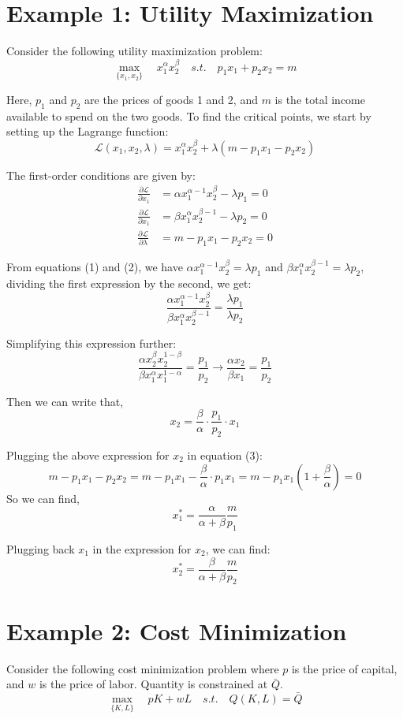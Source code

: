 \documentclass{./../../latex/handout}
\begin{document}
\thispagestyle{plain}
\newcommand{\mytitle}{Optimization Examples}
\myheader{\mytitle}

\section*{Example 1: Utility Maximization}
Consider the following utility maximization problem:\[ \max_{\{x_1,x_2\}} \quad x_1^{\alpha} x_2^{\beta} \quad s.t. \quad p_1 x_1 + p_2 x_2 = m \]
 
 Here, $p_1$ and $p_2$ are the prices of goods 1 and 2, and $m$ is the total income available to spend on the two goods. 
 To find the critical points, we start by setting up the Lagrange function: 
  \[ \mathcal{L}(x_1,x_2,\lambda) =  x_1^{\alpha} x_2^{\beta} + \lambda(m-p_1 x_1-p_2 x_2)\]
  
The first-order conditions are given by:
\begin{align}
	\frac{\partial \mathcal{L}}{\partial x_1} &= \alpha x_1^{\alpha-1}x_2^{\beta}-\lambda p_1 = 0 \\ 
	 \frac{\partial \mathcal{L}}{\partial x_1} &= \beta x_1^{\alpha}x_2^{\beta-1}-\lambda p_2 = 0 \\
	  \frac{\partial \mathcal{L}}{\partial \lambda} &= m-p_1 x_1-p_2 x_2 = 0 
\end{align}

From equations (1) and (2), we have $\alpha x_1^{\alpha-1}x_2^{\beta}=\lambda p_1 $ and  $\beta x_1^{\alpha}x_2^{\beta-1}=\lambda p_2$, dividing the first expression by the second, we get:
\[ \frac{\alpha x_1^{\alpha-1}x_2^{\beta}}{\beta x_1^{\alpha}x_2^{\beta-1}} = \frac{\lambda p_1}{\lambda p_2}\]

Simplifying this expression further:
\[ \frac{\alpha x_2^{\beta}x_2^{1-\beta}}{\beta x_1^{\alpha}x_1^{1-\alpha}} = \frac{ p_1}{ p_2} \rightarrow \frac{\alpha x_2}{\beta x_1} = \frac{p_1}{p_2} \]

Then we can write that, 
\[ x_2 = \frac{\beta}{\alpha}\cdot\frac{p_1}{p_2} \cdot x_1\]

Plugging the above expression for $x_2$  in equation (3):
\[ m-p_1 x_1-p_2 x_2 = m-p_1 x_1- \frac{\beta}{\alpha}\cdot p_1 x_1 = m-p_1 x_1\left(1+ \frac{\beta}{\alpha}\right) =0  \]
So we can find, \[x^*_1 = \frac{\alpha}{\alpha+\beta}\frac{m}{p_1}\]

Plugging back $x_1$ in the expression for $x_2$, we can find:
\[x^*_2 = \frac{\beta}{\alpha+\beta}\frac{m}{p_2}\] 

\section*{Example 2: Cost Minimization}
Consider the following cost minimization problem where $p$ is the price of capital, and $w$ is the price of labor. Quantity is constrained at $\bar{Q}$. 
\[ \max_{\{K,L\}} \quad p K + w L \quad s.t. \quad Q(K,L) = \bar{Q} \]
\end{document}
